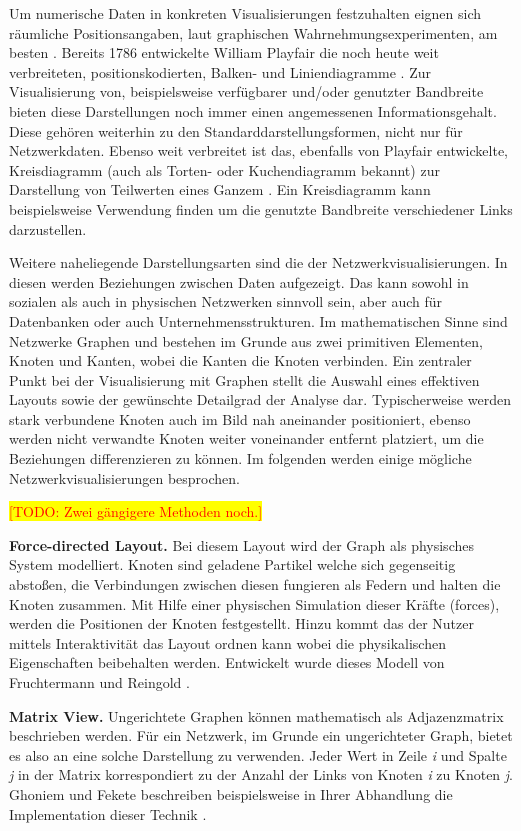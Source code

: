 \documentclass[draft=false
              ,paper=a4
              ,twoside=false
              ,fontsize=11pt
              ,headsepline
              ,BCOR10mm
              ,DIV11
              ]{scrbook}
\newcommand{\TODO}[1]{\colorbox{yellow}{\textcolor{red}{[TODO: #1]}}}
\begin{document}
Um numerische Daten in konkreten Visualisierungen festzuhalten eignen sich räumliche Positionsangaben, laut graphischen Wahrnehmungsexperimenten, am besten \cite{heer_tour_2010}. Bereits 1786 entwickelte William Playfair die noch heute weit verbreiteten, positionskodierten, Balken- und Liniendiagramme \cite{playfair_playfairs_1768}. Zur Visualisierung von, beispielsweise verfügbarer und/oder genutzter Bandbreite bieten diese Darstellungen noch immer einen angemessenen Informationsgehalt. Diese gehören weiterhin zu den Standarddarstellungsformen, nicht nur für Netzwerkdaten. Ebenso weit verbreitet ist das, ebenfalls von Playfair entwickelte, Kreisdiagramm (auch als Torten- oder Kuchendiagramm bekannt) zur Darstellung von Teilwerten eines Ganzem \cite{playfair_statistical_1801}. Ein Kreisdiagramm kann beispielsweise Verwendung finden um die genutzte Bandbreite verschiedener Links darzustellen. 

Weitere naheliegende Darstellungsarten sind die der Netzwerkvisualisierungen. In diesen werden Beziehungen zwischen Daten aufgezeigt. Das kann sowohl in sozialen als auch in physischen Netzwerken sinnvoll sein, aber auch für Datenbanken oder auch Unternehmensstrukturen. Im mathematischen Sinne sind Netzwerke Graphen und bestehen im Grunde aus zwei primitiven Elementen, Knoten und Kanten, wobei die Kanten die Knoten verbinden. Ein zentraler Punkt bei der Visualisierung mit Graphen stellt die Auswahl eines effektiven Layouts sowie der gewünschte Detailgrad der Analyse dar. Typischerweise werden stark verbundene Knoten auch im Bild nah aneinander positioniert, ebenso werden nicht verwandte Knoten weiter voneinander entfernt platziert, um die Beziehungen differenzieren zu können. Im folgenden werden einige mögliche Netzwerkvisualisierungen besprochen.

\TODO{Zwei gängigere Methoden noch.}

\textbf{Force-directed Layout.}  Bei diesem Layout wird der Graph als physisches System modelliert. Knoten sind geladene Partikel welche sich gegenseitig abstoßen, die Verbindungen zwischen diesen fungieren als Federn und halten die Knoten zusammen. Mit Hilfe einer physischen Simulation dieser Kräfte (forces), werden die Positionen der Knoten festgestellt. Hinzu kommt das der Nutzer mittels Interaktivität das Layout ordnen kann wobei die physikalischen Eigenschaften beibehalten werden. Entwickelt wurde dieses Modell von Fruchtermann und Reingold \cite{Fruchterman91graphdrawing}. 

\textbf{Matrix View.} Ungerichtete Graphen können mathematisch als Adjazenzmatrix beschrieben werden. Für ein Netzwerk, im Grunde ein ungerichteter Graph, bietet es also an eine solche Darstellung zu verwenden. Jeder Wert in Zeile \textit{i} und Spalte \textit{j} in der Matrix korrespondiert zu der Anzahl der Links von Knoten \textit{i} zu Knoten \textit{j}. Ghoniem und Fekete beschreiben beispielsweise in Ihrer Abhandlung die Implementation dieser Technik \cite{Ghoniem:2003:MVG:1063669.1063698}.
\end{document}
